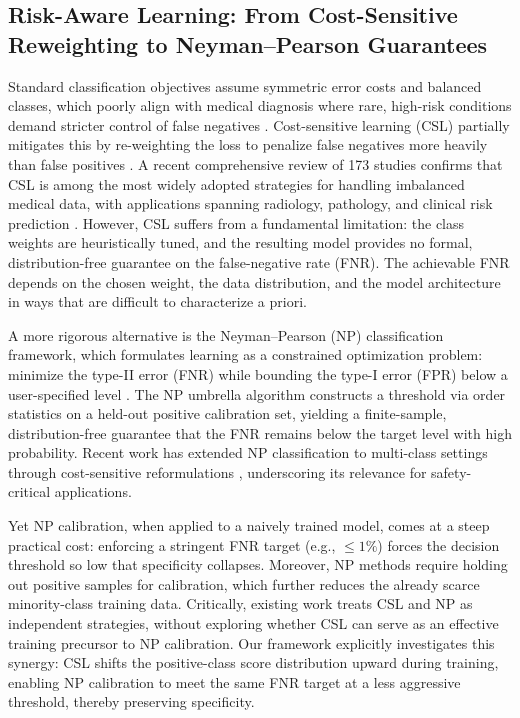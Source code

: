 \subsection{Risk-Aware Learning: From Cost-Sensitive Reweighting to Neyman--Pearson Guarantees}

Standard classification objectives assume symmetric error costs and balanced classes, which poorly align with medical diagnosis where rare, high-risk conditions demand stricter control of false negatives \cite{he2009learning}. Cost-sensitive learning (CSL) partially mitigates this by re-weighting the loss to penalize false negatives more heavily than false positives \cite{elkan2001foundations}. A recent comprehensive review of 173 studies confirms that CSL is among the most widely adopted strategies for handling imbalanced medical data, with applications spanning radiology, pathology, and clinical risk prediction \cite{araf2024cost}. However, CSL suffers from a fundamental limitation: the class weights are heuristically tuned, and the resulting model provides no formal, distribution-free guarantee on the false-negative rate (FNR). The achievable FNR depends on the chosen weight, the data distribution, and the model architecture in ways that are difficult to characterize a priori.

A more rigorous alternative is the Neyman--Pearson (NP) classification framework, which formulates learning as a constrained optimization problem: minimize the type-II error (FNR) while bounding the type-I error (FPR) below a user-specified level \cite{rigollet2011neyman}. The NP umbrella algorithm \cite{tong2018neyman} constructs a threshold via order statistics on a held-out positive calibration set, yielding a finite-sample, distribution-free guarantee that the FNR remains below the target level with high probability. Recent work has extended NP classification to multi-class settings through cost-sensitive reformulations \cite{tian2025neyman}, underscoring its relevance for safety-critical applications.

Yet NP calibration, when applied to a naively trained model, comes at a steep practical cost: enforcing a stringent FNR target (e.g., $\leq 1\%$) forces the decision threshold so low that specificity collapses. Moreover, NP methods require holding out positive samples for calibration, which further reduces the already scarce minority-class training data. Critically, existing work treats CSL and NP as independent strategies, without exploring whether CSL can serve as an effective training precursor to NP calibration. Our framework explicitly investigates this synergy: CSL shifts the positive-class score distribution upward during training, enabling NP calibration to meet the same FNR target at a less aggressive threshold, thereby preserving specificity.

